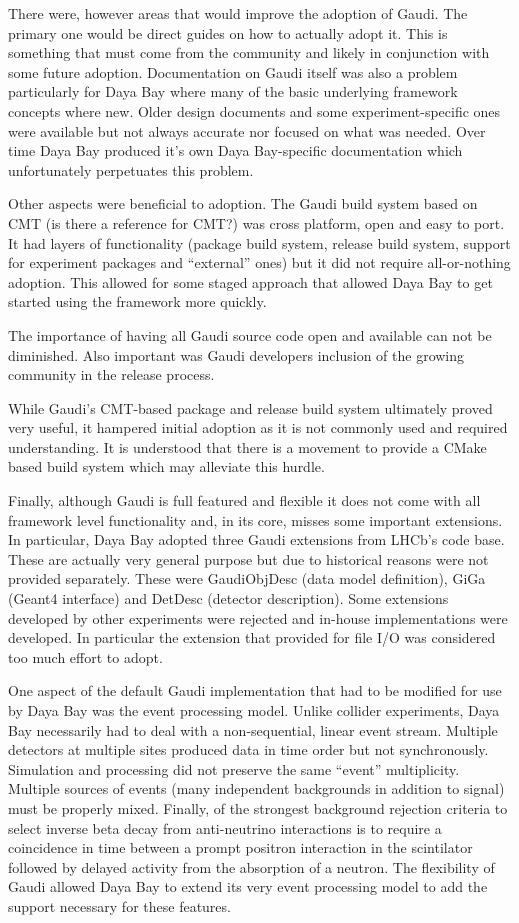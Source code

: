 There were, however areas that would improve the adoption of Gaudi.
The primary one would be direct guides on how to actually adopt it.
This is something that must come from the community and likely in
conjunction with some future adoption.  Documentation on Gaudi itself
was also a problem particularly for Daya Bay where many of the basic
underlying framework concepts where new.  Older design documents and
some experiment-specific ones were available but not always accurate
nor focused on what was needed.  Over time Daya Bay produced it's own
Daya Bay-specific documentation which unfortunately perpetuates this
problem.

Other aspects were beneficial to adoption.  The Gaudi build system
based on CMT (is there a reference for CMT?) was cross platform, open and easy to port.  It had layers
of functionality (package build system, release build system, support
for experiment packages and ``external'' ones) but it did not require
all-or-nothing adoption.  This allowed for some staged approach that
allowed Daya Bay to get started using the framework more quickly.

The importance of having all Gaudi source code open and available can
not be diminished.  Also important was Gaudi developers inclusion of
the growing community in the release process.

While Gaudi's CMT-based package and release build system ultimately
proved very useful, it hampered initial adoption as it is not commonly
used and required understanding.  It is understood that there is a
movement to provide a CMake based build system which may alleviate
this hurdle.

Finally, although Gaudi is full featured and flexible it does not come
with all framework level functionality and, in its core, misses some
important extensions.  In particular, Daya Bay adopted three Gaudi
extensions from LHCb's code base.  These are actually very general
purpose but due to historical reasons were not provided separately.
These were GaudiObjDesc (data model definition), GiGa (Geant4
interface) and DetDesc (detector description).  Some extensions
developed by other experiments were rejected and in-house
implementations were developed.  In particular the extension that
provided for file I/O was considered too much effort to adopt.   

One aspect of the default Gaudi implementation that had to be modified for use by Daya
Bay was the event processing model.  Unlike collider
experiments, Daya Bay necessarily had to deal with a non-sequential,
linear event stream.  Multiple detectors at multiple sites produced
data in time order but not synchronously.  Simulation and processing
did not preserve the same ``event'' multiplicity.  Multiple sources of
events (many independent backgrounds in addition to signal) must be
properly mixed.  Finally, of the strongest background rejection
criteria to select inverse beta decay from anti-neutrino interactions
is to require a coincidence in time between a prompt positron
interaction in the scintilator followed by delayed activity from the
absorption of a neutron.  The flexibility of Gaudi allowed Daya Bay to
extend its very event processing model to add the support necessary
for these features.

